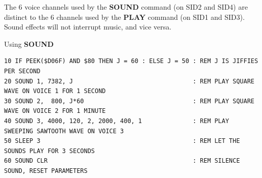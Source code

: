 \begin{description}[leftmargin=2cm,style=nextline]
                  The 6 voice channels used by the {\bf SOUND} command (on SID2 and SID4) are distinct to the 6 channels used by the {\bf PLAY} command (on SID1 and SID3). Sound effects will not interrupt music, and vice versa.

\item [Example:]  Using {\bf SOUND}

\begin{tcolorbox}[colback=black,coltext=white]
\verbatimfont{\codefont}
\begin{verbatim}
10 IF PEEK($D06F) AND $80 THEN J = 60 : ELSE J = 50 : REM J IS JIFFIES PER SECOND
20 SOUND 1, 7382, J                                 : REM PLAY SQUARE WAVE ON VOICE 1 FOR 1 SECOND
30 SOUND 2,  800, J*60                              : REM PLAY SQUARE WAVE ON VOICE 2 FOR 1 MINUTE
40 SOUND 3, 4000, 120, 2, 2000, 400, 1              : REM PLAY SWEEPING SAWTOOTH WAVE ON VOICE 3
50 SLEEP 3                                          : REM LET THE SOUNDS PLAY FOR 3 SECONDS
60 SOUND CLR                                        : REM SILENCE SOUND, RESET PARAMETERS
\end{verbatim}
\end{tcolorbox}
\end{description}


\newpage
